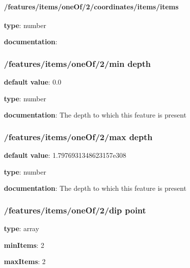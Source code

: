 \begin{itemized}
\begin{itemized}
\paragraph{/features/items/oneOf/2/coordinates/items/items} \begin{itemized}
\item {\bf type}: number
\end{itemized}\item {\bf documentation}: 
\end{itemized}\end{itemized}\subsubsection{/features/items/oneOf/2/min depth} \begin{itemized}
\item {\bf default value}: 0.0
\item {\bf type}: number
\item {\bf documentation}: The depth to which this feature is present
\end{itemized}\subsubsection{/features/items/oneOf/2/max depth} \begin{itemized}
\item {\bf default value}: 1.7976931348623157e308
\item {\bf type}: number
\item {\bf documentation}: The depth to which this feature is present
\end{itemized}\subsubsection{/features/items/oneOf/2/dip point} \begin{itemized}
\item {\bf type}: array
\item {\bf minItems}: 2
\item {\bf maxItems}: 2

\end{itemized}
